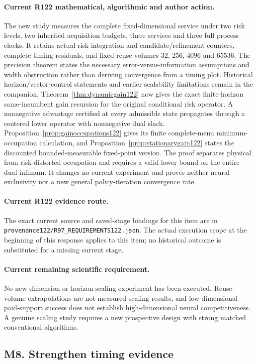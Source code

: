 \paragraph{Current R122 mathematical, algorithmic and author action.}
The new study measures the complete fixed-dimensional service under two risk levels, two inherited acquisition budgets, three services and three full process clocks. It retains actual risk-integration and candidate/refinement counters, complete timing residuals, and fixed reuse volumes 32, 256, 4096 and 65536. The precision theorem states the necessary error-versus-information assumptions and width obstruction rather than deriving convergence from a timing plot. Historical horizon/vector-control statements and earlier scalability limitations remain in the companion. Theorem~\ref{thm:dynamicgain122} now gives the exact finite-horizon same-incumbent gain recursion for the original conditional risk operator. A nonnegative advantage certified at every admissible state propagates through a centered lower operator with nonnegative dual slack. Proposition~\ref{prop:gainoccupations122} gives its finite complete-menu minimum-occupation calculation, and Proposition~\ref{prop:stationarygain122} states the discounted bounded-measurable fixed-point version. The proof separates physical from risk-distorted occupation and requires a valid lower bound on the entire dual infimum. It changes no current experiment and proves neither neural exclusivity nor a new general policy-iteration convergence rate.
\paragraph{Current R122 evidence route.}
The exact current source and saved-stage bindings for this item are in \nolinkurl{provenance122/R97_REQUIREMENTS122.json}. The actual execution scope at the beginning of this response applies to this item; no historical outcome is substituted for a missing current stage.
\paragraph{Current remaining scientific requirement.}
No new dimension or horizon scaling experiment has been executed. Reuse-volume extrapolations are not measured scaling results, and low-dimensional paid-support success does not establish high-dimensional neural competitiveness. A genuine scaling study requires a new prospective design with strong matched conventional algorithms.

\subsection{M8. Strengthen timing evidence}
\label{response122:M8}


